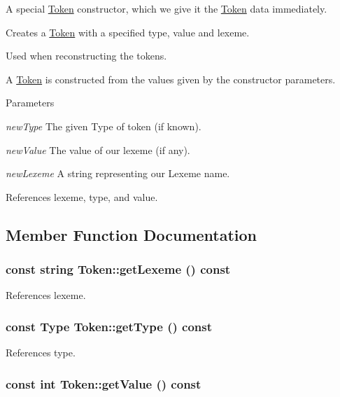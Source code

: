 A special \hyperlink{classToken}{Token} constructor, which we give it the \hyperlink{classToken}{Token} data immediately. 

Creates a \hyperlink{classToken}{Token} with a specified type, value and lexeme.

Used when reconstructing the tokens.

A \hyperlink{classToken}{Token} is constructed from the values given by the constructor parameters.


\begin{DoxyParams}{Parameters}
\item[{\em newType}]The given Type of token (if known). \item[{\em newValue}]The value of our lexeme (if any). \item[{\em newLexeme}]A string representing our Lexeme name. \end{DoxyParams}


References lexeme, type, and value.



\subsection{Member Function Documentation}
\hypertarget{classToken_af056820e37b409c87f7bb17ea8139a42}{
\subsubsection[{getLexeme}]{\setlength{\rightskip}{0pt plus 5cm}const string Token::getLexeme () const}}
\label{classToken_af056820e37b409c87f7bb17ea8139a42}


References lexeme.

\hypertarget{classToken_ab0fd5697b1b85d91ac491e687a2044f2}{
\subsubsection[{getType}]{\setlength{\rightskip}{0pt plus 5cm}const {\bf Type} Token::getType () const}}
\label{classToken_ab0fd5697b1b85d91ac491e687a2044f2}


References type.

\hypertarget{classToken_a9241d3f6b9174f79cdc74e824a3b8422}{
\subsubsection[{getValue}]{\setlength{\rightskip}{0pt plus 5cm}const int Token::getValue () const}}
\label{classToken_a9241d3f6b9174f79cdc74e824a3b8422}


